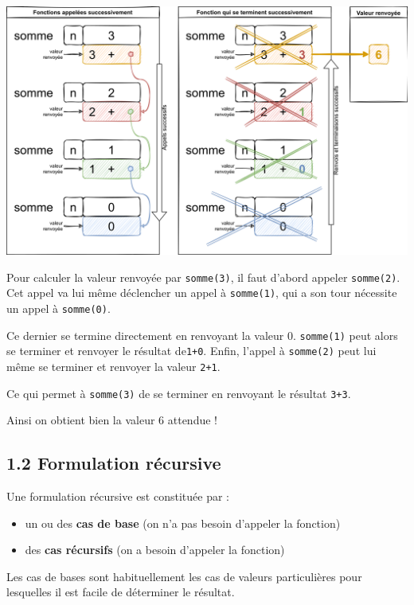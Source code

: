 \documentclass[a4paper,17pt]{extarticle}
\providecommand{\tightlist}{%
      \setlength{\itemsep}{0pt}\setlength{\parskip}{0pt}}
\begin{document}
\begin{exemple}
\includegraphics{res/rec-somme3.png}

Pour calculer la valeur renvoyée par \texttt{somme(3)}, il faut d'abord
appeler \texttt{somme(2)}. Cet appel va lui même déclencher un appel à
\texttt{somme(1)}, qui a son tour nécessite un appel à
\texttt{somme(0)}.

Ce dernier se termine directement en renvoyant la valeur 0.
\texttt{somme(1)} peut alors se terminer et renvoyer le résultat
de\texttt{1+0}. Enfin, l'appel à \texttt{somme(2)} peut lui même se
terminer et renvoyer la valeur \texttt{2+1}.

Ce qui permet à \texttt{somme(3)} de se terminer en renvoyant le
résultat \texttt{3+3}.

Ainsi on obtient bien la valeur 6 attendue !

            \end{exemple}
    \hypertarget{formulation-ruxe9cursive}{%
\subsection{1.2 Formulation récursive}\label{formulation-ruxe9cursive}}

Une formulation récursive est constituée par :

\begin{itemize}
\tightlist
\item
  un ou des \textbf{cas de base} (on n'a pas besoin d'appeler la
  fonction)
\item
  des \textbf{cas récursifs} (on a besoin d'appeler la fonction)
\end{itemize}

Les cas de bases sont habituellement les cas de valeurs particulières
pour lesquelles il est facile de déterminer le résultat.
\end{document}
